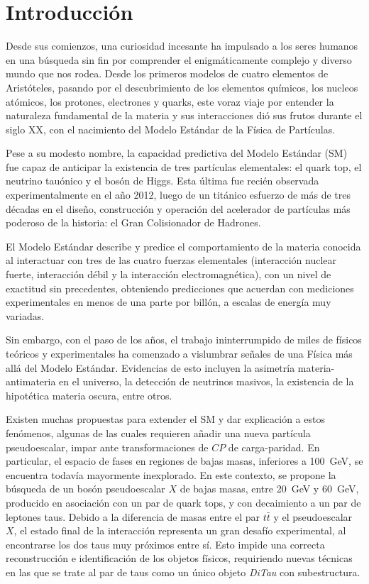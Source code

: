\chapter*{Introducción}

Desde sus comienzos, una curiosidad incesante ha impulsado a los seres humanos en una búsqueda sin fin por comprender el enigmáticamente complejo y diverso mundo que nos rodea. Desde los primeros modelos de cuatro elementos de Aristóteles, pasando por el descubrimiento de los elementos químicos, los nucleos atómicos, los protones, electrones y quarks, este voraz viaje por entender la naturaleza fundamental de la materia y sus interacciones dió sus frutos durante el siglo XX, con el nacimiento del Modelo Estándar de la Física de Partículas.

Pese a su modesto nombre, la capacidad predictiva del Modelo Estándar (SM) fue capaz de anticipar la existencia de tres partículas elementales: el quark top, el neutrino tauónico y el bosón de Higgs. Esta última fue recién observada experimentalmente en el año 2012, luego de un titánico esfuerzo de más de tres décadas en el diseño, construcción y operación del acelerador de partículas más poderoso de la historia: el Gran Colisionador de Hadrones.

El Modelo Estándar describe y predice el comportamiento de la materia conocida al interactuar con tres de las cuatro fuerzas elementales (interacción nuclear fuerte, interacción débil y la interacción electromagnética), con un nivel de exactitud sin precedentes, obteniendo predicciones que acuerdan con mediciones experimentales en menos de una parte por billón, a escalas de energía muy variadas.

Sin embargo, con el paso de los años, el trabajo ininterrumpido de miles de físicos teóricos y experimentales ha comenzado a vislumbrar señales de una Física más allá del Modelo Estándar. Evidencias de esto incluyen la asimetría materia-antimateria en el universo, la detección de neutrinos masivos, la existencia de la hipotética materia oscura, entre otros.

Existen muchas propuestas para extender el SM y dar explicación a estos fenómenos, algunas de las cuales requieren añadir una nueva partícula pseudoescalar, impar ante transformaciones de $CP$ de carga-paridad. En particular, el espacio de fases en regiones de bajas masas, inferiores a \SI{100}{\GeV}, se encuentra todavía mayormente inexplorado. En este contexto, se propone la búsqueda de un bosón pseudoescalar $X$ de bajas masas, entre \SI{20}{\GeV} y \SI{60}{\GeV}, producido en asociación con un par de quark tops, y con decaimiento a un par de leptones taus. Debido a la diferencia de masas entre el par $t\bar{t}$ y el pseudoescalar $X$, el estado final de la interacción representa un gran desafío experimental, al encontrarse los dos taus muy próximos entre sí. Esto impide una correcta reconstrucción e identificación de los objetos físicos, requiriendo nuevas técnicas en las que se trate al par de taus como un único objeto \textit{DiTau} con subestructura.

